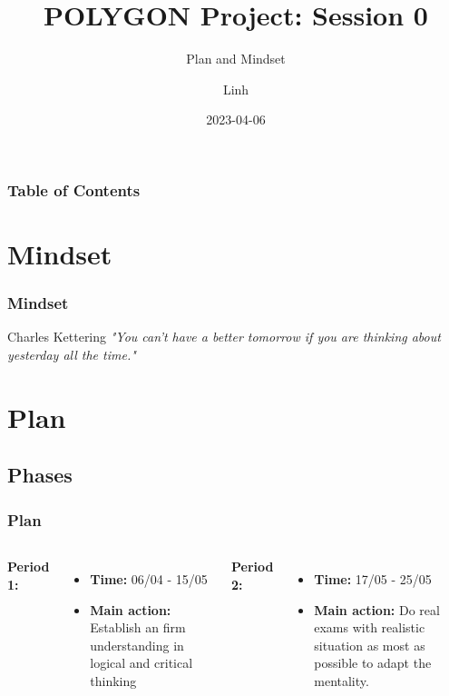 \documentclass{beamer}
\title{POLYGON Project: Session 0}
\subtitle{Plan and Mindset}
\author{Linh}
\date{2023-04-06}
\begin{document}
\frame{\titlepage}
\begin{frame}
    \frametitle{Table of Contents}
    \tableofcontents
    \end{frame}
\section{Mindset}
\begin{frame}
\frametitle{Mindset}
\begin{block}{Charles Kettering}
    \textit{"You can't have a better tomorrow if you are thinking about yesterday all the time."}
    \end{block}
\end{frame}
\section{Plan}
\subsection{Phases}

\begin{frame}
    \frametitle{Plan}
    \begin{columns}
        \textbf{Period 1:}
        \begin{itemize}
            \item \textbf{Time:} 06/04 - 15/05
            \item \textbf{Main action:} Establish an firm understanding in logical and critical thinking
        \end{itemize}
        
        \textbf{Period 2:}
        \begin{itemize}
            \item \textbf{Time:} 17/05 - 25/05
            \item \textbf{Main action:} Do real exams with realistic situation as most as possible to adapt the mentality.
        \end{itemize}
        \end{columns}
    \end{frame}
\end{document}

